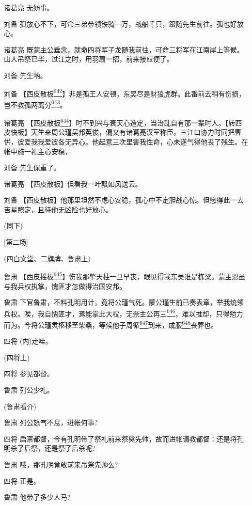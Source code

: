 诸葛亮 无妨事。

刘备
孤放心不下，可命三弟带领铁骑一万，战船千只，跟随先生前往。孤也好放心。

诸葛亮
既蒙主公垂念，就命四将军子龙随我前往，可命三将军在江南岸上等候。山人吊祭已毕，过江之时，用羽扇一招，前来接应便了。

刘备 先生呐。

刘备
【西皮散板\protect\hyperlink{fn642}{\textsuperscript{642}}】非是孤王人安顿，东吴尽是豺狼虎群。此番前去稍有伤损，岂不教孤两离分\protect\hyperlink{fn643}{\textsuperscript{643}}。

诸葛亮
【西皮散板\protect\hyperlink{fn644}{\textsuperscript{644}}】时不到兴与衰天心造定，当治乱自有那一辈时人。【转西皮快板】天生来周公瑾吴邦英俊，偏又有诸葛亮汉室称臣。三江口协力时同把曹併，彼爱我我爱彼各无异心。他起意三次里害我性命，心未遂气得他丧了残生。在帐中施一礼主心安稳，

刘备 先生保重了。

诸葛亮 【西皮散板】但看我一叶飘如风送云。

刘备
【西皮散板】他那里坦然不虑心安稳，孤心中不定胆战心惊。但愿得此一去吉星照定，且待他无凶险也好放心。

(同下)

{[}第二场{]}

(四白文堂、二旗牌、鲁肃上)

鲁肃
【西皮摇板\protect\hyperlink{fn645}{\textsuperscript{645}}】伤我那擎天柱一旦早丧，眼见得我东吴谁是栋梁。蒙主恩虽与我兵权执掌，愧匪才怎做得治国安邦。

鲁肃
下官鲁肃，不料孔明用计，竟将公瑾气死。蒙公瑾生前已奏表章，举我统领兵权。唉，我自愧匪才，焉能掌此大权，无奈主公再三\protect\hyperlink{fn646}{\textsuperscript{646}}，难以推却，只得勉力而为。今将公瑾灵柩移至柴桑，等候他子周循\protect\hyperlink{fn647}{\textsuperscript{647}}到来，成服\protect\hyperlink{fn648}{\textsuperscript{648}}丧葬也。

四将 (内)走哇。

(四将上)

四将 参见都督。

鲁肃 列公少礼。

(鲁肃看介)

鲁肃 列公怒气不息，进帐何事?

四将
启禀都督，今有孔明带了祭礼前来祭奠先帅，故而进帐请教都督：还是将孔明杀了后祭，还是祭了后杀呢?

鲁肃 哦，那孔明竟敢前来吊祭先帅么?

四将 正是。

鲁肃 他带了多少人马?

